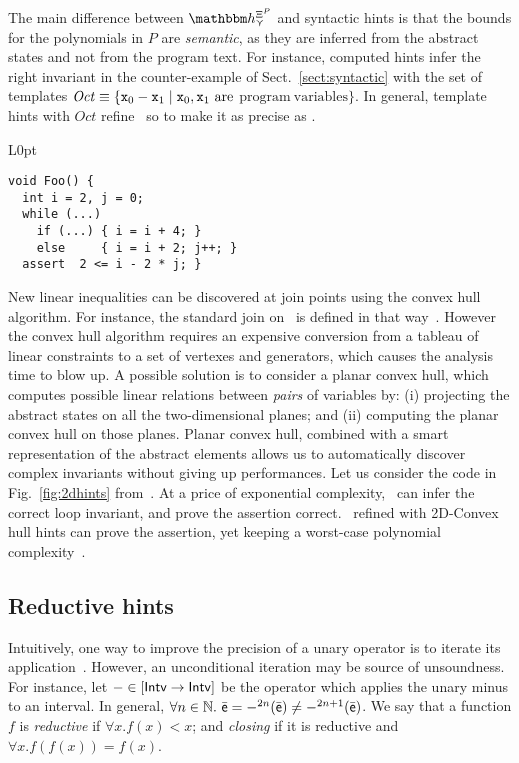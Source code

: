 \documentclass{llncs}
\newcommand{\sopra}{\vspace{-.3cm}}
\begin{document}
\sopra
The main difference between $\hint{\cjoin}^{\hintcomp^{P}}$ and
syntactic hints is that the bounds for the polynomials in $P$ are \emph{semantic},
as they are inferred from the abstract states and not from the
program text.
For instance, computed hints infer the right invariant in
the counter-example of Sect.~\ref{sect:syntactic}  with the set of templates $\mathit{Oct} \equiv \{ \mathtt{x}_0 - \mathtt{x}_1
\mid \mathtt{x}_0, \mathtt{x}_1\ \text{are}$ $\text{program}\
\text{variables} \}$.
In general, template hints with $\mathit{Oct}$ refine \Polyhedra\
so to make it as precise as \Octagons.

\begin{wrapfigure}{L}{0pt}
\small
\begin{minipage}{5.5cm}
\begin{Verbatim}
void Foo() {
  int i = 2, j = 0;
  while (...) 
    if (...) { i = i + 4; }
    else     { i = i + 2; j++; } 
  assert  2 <= i - 2 * j; }
\end{Verbatim}
\end{minipage}
\caption{Example requiring the use of 2D-convex hull hints}
\label{fig:2dhints}
\end{wrapfigure}


New linear inequalities can be discovered at join points using the convex hull
algorithm.
For instance, the standard join on \Polyhedra\ is defined in that way~\cite{CousotHalbwachs78}.
However the convex hull algorithm requires an expensive conversion
from a tableau of linear constraints to a set of vertexes and
generators, which causes the analysis time to blow up.
A possible solution is to consider a planar convex hull, which 
computes possible linear relations between \emph{pairs} of variables by: (i) projecting
the abstract states on all the two-dimensional planes; and (ii) computing the
planar convex hull on those planes. 
Planar convex hull, combined with a smart representation of the
abstract elements allows us to automatically discover complex invariants
without giving up performances.
Let us consider the code in Fig.~\ref{fig:2dhints} from~\cite{CousotHalbwachs78}.
At a price of exponential complexity, \Poly\ can infer the correct loop invariant, and prove the assertion
correct.
\Subpoly\ refined with 2D-Convex hull hints can prove the assertion,
yet keeping a worst-case polynomial complexity~\cite{LavironLogozzo09}. 

\sopra
\subsection{Reductive hints}
Intuitively, one way to improve the precision of a unary operator is to iterate its application~\cite{Granger92}.
However, an unconditional iteration may be source of unsoundness.
For instance, let $- \in [\mathsf{Intv} \rightarrow\mathsf{Intv}]$ be the operator which
applies the unary minus to an interval.
In general, $\forall n \in \mathbb{N}.\ \bar{\mathsf{\mathsf{e}}} = -^{2n}(\bar{\mathsf{\mathsf{e}}}) \neq
-^{2n+1}(\bar{\mathsf{\mathsf{e}}})$.
We say that a function $f$ is \emph{reductive} if $\forall x. f(x) \less x$; and  \emph{closing} if it is reductive and $\forall x. f(f(x)) = f(x)$.
\end{document}
